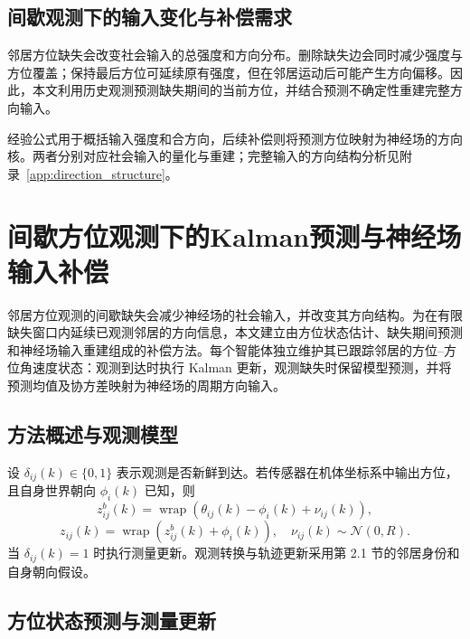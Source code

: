 \documentclass[UTF8,fontset=windows,11pt]{ctexart}
\begin{document}
\subsection{间歇观测下的输入变化与补偿需求}
邻居方位缺失会改变社会输入的总强度和方向分布。删除缺失边会同时减少强度与方位覆盖；保持最后方位可延续原有强度，但在邻居运动后可能产生方向偏移。因此，本文利用历史观测预测缺失期间的当前方位，并结合预测不确定性重建完整方向输入。

经验公式用于概括输入强度和合方向，后续补偿则将预测方位映射为神经场的方向核。两者分别对应社会输入的量化与重建；完整输入的方向结构分析见附录~\ref{app:direction_structure}。

\section{间歇方位观测下的Kalman预测与神经场输入补偿}

邻居方位观测的间歇缺失会减少神经场的社会输入，并改变其方向结构。为在有限缺失窗口内延续已观测邻居的方向信息，本文建立由方位状态估计、缺失期间预测和神经场输入重建组成的补偿方法。每个智能体独立维护其已跟踪邻居的方位--方位角速度状态：观测到达时执行 Kalman 更新，观测缺失时保留模型预测，并将预测均值及协方差映射为神经场的周期方向输入。

\subsection{方法概述与观测模型}
设 $\delta_{ij}(k)\in\{0,1\}$ 表示观测是否新鲜到达。若传感器在机体坐标系中输出方位，且自身世界朝向 $\phi_i(k)$ 已知，则
\begin{equation}
 z^b_{ij}(k)=\operatorname{wrap}(\theta_{ij}(k)-\phi_i(k)+\nu_{ij}(k)),
\end{equation}
\begin{equation}
 z_{ij}(k)=\operatorname{wrap}(z^b_{ij}(k)+\phi_i(k)),
 \quad \nu_{ij}(k)\sim\mathcal N(0,R).
\end{equation}
当 $\delta_{ij}(k)=1$ 时执行测量更新。观测转换与轨迹更新采用第 2.1 节的邻居身份和自身朝向假设。

\subsection{方位状态预测与测量更新}
\end{document}
